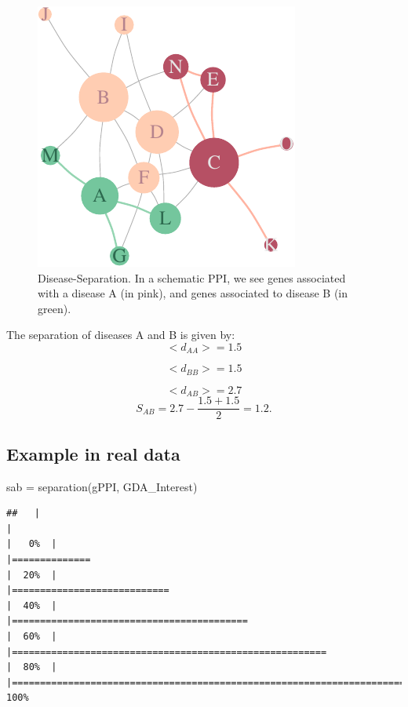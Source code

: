 \documentclass[
]{book}
\newenvironment{Shaded}{\begin{snugshade}}{\end{snugshade}}
\newcommand{\FunctionTok}[1]{\textcolor[rgb]{0.00,0.00,0.00}{#1}}
\newcommand{\NormalTok}[1]{#1}
\newcommand{\OtherTok}[1]{\textcolor[rgb]{0.56,0.35,0.01}{#1}}
\begin{document}
\begin{figure}
\centering
\includegraphics{NetMed_files/figure-latex/separation-1.pdf}
\caption{\label{fig:separation}Disease-Separation. In a schematic PPI, we see genes associated with a disease A (in pink), and genes associated to disease B (in green).}
\end{figure}

The separation of diseases A and B is given by: \[
<d_{AA}> = 1.5
\]

\[
<d_{BB}> = 1.5
\]

\[
<d_{AB}> = 2.7
\] \[
S_{AB} = 2.7 - \frac{1.5+ 1.5}2 = 1.2.
\]

\hypertarget{example-in-real-data-1}{%
\subsection{Example in real data}\label{example-in-real-data-1}}

\begin{Shaded}
\begin{Highlighting}[]
\NormalTok{sab }\OtherTok{=} \FunctionTok{separation}\NormalTok{(gPPI, GDA\_Interest)}
\end{Highlighting}
\end{Shaded}

\begin{verbatim}
##   |                                                                              |                                                                      |   0%  |                                                                              |==============                                                        |  20%  |                                                                              |============================                                          |  40%  |                                                                              |==========================================                            |  60%  |                                                                              |========================================================              |  80%  |                                                                              |======================================================================| 100%
\end{verbatim}
\end{document}
